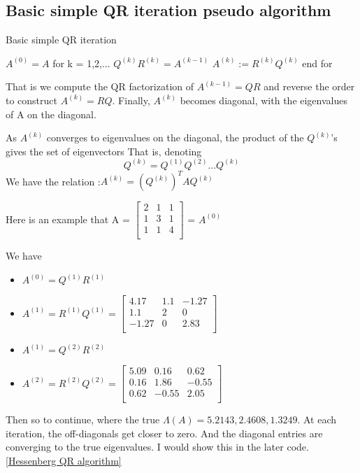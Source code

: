 \subsection{Basic simple QR iteration pseudo algorithm}
\begin{algorithm}
\caption{Basic simple QR iteration}
\label{Basic simple QR iteration}
    \begin{algorithmic}
        \STATE \(A^{(0)} = A\)
        \STATE for k = 1,2,...
            \STATE \quad \(Q^{(k)}R^{(k)} = A^{(k-1)}\)
            \STATE \quad \(A^{(k)} := R^{(k)}Q^{(k)}\)
        \STATE end for
    \end{algorithmic}
\end{algorithm}
That is we compute the QR factorization of $A^{(k-1)}=QR$ and reverse the order to construct $A^{(k)} = RQ$. Finally, $A^{(k)}$ becomes diagonal, with the eigenvalues of A on the diagonal.

As $A^{(k)}$ converges to eigenvalues on the diagonal, the product of the $Q^{(k)}$'s gives the set of eigenvectors
That is, denoting
\begin{equation}
    Q^{(k)} = Q^{(1)}Q^{(2)}...Q^{(k)}   
\end{equation}
We have the relation :$A^{(k)} = ({Q^{(k)}})^TAQ^{(k)}$

Here is an example that A =
$    \begin{bmatrix}
         2 & 1 & 1\\
         1 & 3 & 1\\
         1 & 1 & 4 \\
    \end{bmatrix}$
= $A^{(0)}$

We have 
\begin{itemize}
    \item $A^{(0)} = Q^{(1)}R^{(1)}$
    \item $A^{(1)} = R^{(1)}Q^{(1)} =  \begin{bmatrix}
         4.17 & 1.1 & -1.27\\
         1.1 & 2 & 0\\
         -1.27 & 0 & 2.83 \\
    \end{bmatrix}$
    \item $A^{(1)} = Q^{(2)}R^{(2)}$
    \item $A^{(2)} = R^{(2)}Q^{(2)} = \begin{bmatrix}
         5.09 & 0.16 & 0.62\\
         0.16 & 1.86 & -0.55\\
         0.62 & -0.55 & 2.05 \\
    \end{bmatrix}$
\end{itemize}
Then so to continue, where the true $\Lambda (A) = {5.2143, 2.4608, 1.3249}$. At each iteration, the off-diagonals get closer to zero. And the diagonal entries are converging to the true eigenvalues.
I would show this in the later code. \ref{Hessenberg QR algorithm} \label{Old friend}





